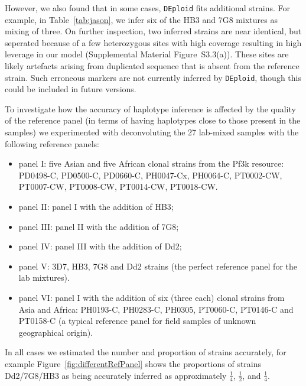 \documentclass{bioinfo}
\begin{document}
However, we also found that in some cases, \texttt{DEploid} fits additional strains. For example, in Table~\ref{tab:jason}, we infer six of the HB3 and 7G8 mixtures as mixing of three.  On further inspection, two inferred strains are near identical, but seperated because of a few heterozygous sites with high coverage resulting in high leverage in our model (Supplemental Material Figure~S3.3(a)). These sites are likely artefacts arising from duplicated sequence that is absent from the reference strain.  Such erroneous markers are not currently inferred by \texttt{DEploid}, though this could be included in future versions.

To investigate how the accuracy of haplotype inference is affected by the quality of the reference panel (in terms of having haplotypes close to those present in the samples) we experimented with deconvoluting the 27 lab-mixed samples with the following reference panels:

\begin{itemize}

\item panel I: five Asian and five African clonal strains from the Pf3k\citep{Pf3k2016} resource: {\textmd PD0498-C}, {\textmd PD0500-C}, {\textmd PD0660-C}, {\textmd PH0047-Cx}, {\textmd PH0064-C}, {\textmd PT0002-CW}, {\textmd PT0007-CW}, {\textmd PT0008-CW}, {\textmd PT0014-CW}, {\textmd PT0018-CW}.

\item panel II: panel I with the addition of HB3;

\item panel III: panel II with the addition of 7G8;

\item panel IV: panel III with the addition of Dd2;

\item panel V: 3D7, HB3, 7G8 and Dd2 strains (the perfect reference panel for the lab mixtures).

\item panel VI: panel I with the addition of six (three each) clonal strains from Asia and Africa: {\textmd PH0193-C}, {\textmd PH0283-C}, {\textmd PH0305}, {\textmd PT0060-C}, {\textmd PT0146-C} and {\textmd PT0158-C} (a typical reference panel for field samples of unknown geographical origin).

\end{itemize}



\noindent In all cases we estimated the number and proportion of strains accurately, for example Figure~\ref{fig:differentRefPanel} shows the proportions of strains Dd2/7G8/HB3 as being accurately inferred as approximately $\frac{1}{4}$, $\frac{1}{2}$, and $\frac{1}{4}$.
\end{document}

